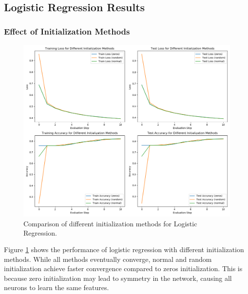 \documentclass[journal, a4paper]{IEEEtran}
\begin{document}
\subsection{Logistic Regression Results}

\subsubsection{Effect of Initialization Methods}
\begin{figure}[htbp]
\centering
\includegraphics[width=\linewidth]{logistic_regression_init_methods.png}
\caption{Comparison of different initialization methods for Logistic Regression.}
\label{fig:lr_init}
\end{figure}

Figure \ref{fig:lr_init} shows the performance of logistic regression with different initialization methods. While all methods eventually converge, normal and random initialization achieve faster convergence compared to zeros initialization. This is because zero initialization may lead to symmetry in the network, causing all neurons to learn the same features.
\end{document}
